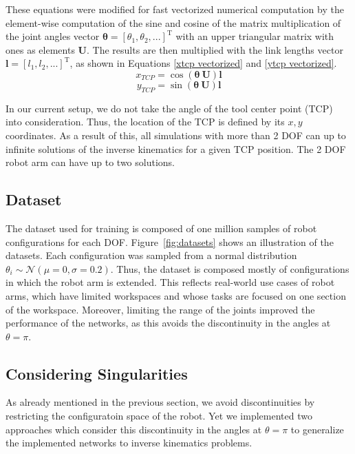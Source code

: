 \documentclass[conference]{IEEEtran}
\begin{document}
These equations were modified for fast vectorized numerical computation by the element-wise computation of the sine and cosine of the matrix multiplication of the joint angles vector \( \bm{\theta} = \left[ \theta_1, \theta_2 , ... \right]^\text{T} \) with an upper triangular matrix with ones as elements \( \bm{U} \). The results are then multiplied with the link lengths vector \( \bm{l} = \left[ l_1, l_2, ... \right]^\text{T} \), as shown in Equations \ref{xtcp vectorized} and \ref{ytcp vectorized}.
\begin{equation}
    x_{TCP} = \cos \left( \bm{\theta}\ \bm{U} \right) \bm{l}
    \label{xtcp vectorized}
\end{equation}
\begin{equation}
    y_{TCP} = \sin \left( \bm{\theta}\ \bm{U} \right) \bm{l}
    \label{ytcp vectorized}
\end{equation}

In our current setup, we do not take the angle of the tool center point (TCP) into consideration. Thus, the location of the TCP is defined by its \( x, y \) coordinates. As a result of this, all simulations with more than 2 DOF can up to infinite solutions of the inverse kinematics for a given TCP position. The 2 DOF robot arm can have up to two solutions.

\subsection*{Dataset}

The dataset used for training is composed of one million samples of robot configurations for each DOF. Figure~\ref{fig:datasets} shows an illustration of the datasets. Each configuration was sampled from a normal distribution $ \theta_i \sim \mathcal{N}(\mu=0, \sigma=0.2) $. Thus, the dataset is composed mostly of configurations in which the robot arm is extended. This reflects real-world use cases of robot arms, which have limited workspaces and whose tasks are focused on one section of the workspace. Moreover, limiting the range of the joints improved the performance of the networks, as this avoids the discontinuity in the angles at \( \theta = \pi \).


\subsection*{Considering Singularities}

As already mentioned in the previous section, we avoid discontinuities by restricting the configuratoin space of the robot. Yet we implemented two approaches which consider this discontinuity in the angles at \( \theta = \pi \) to generalize the implemented networks to inverse kinematics problems.
\end{document}
